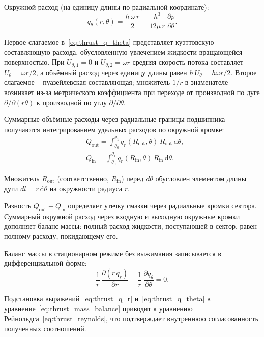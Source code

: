 Окружной расход (на единицу длины по радиальной координате):
\begin{equation}
q_\theta(r,\theta) = \frac{h\,\omega\,r}{2} - \frac{h^3}{12\mu\,r}\,\frac{\partial p}{\partial \theta}.
\label{eq:thrust_q_theta}
\end{equation}

Первое слагаемое в~\eqref{eq:thrust_q_theta} представляет куэттовскую составляющую расхода, обусловленную увлечением жидкости вращающейся поверхностью. При $U_{\theta,1}=0$ и $U_{\theta,2}=\omega r$ средняя скорость потока составляет $\bar{U}_\theta = \omega r / 2$, а объёмный расход через единицу длины равен $h\,\bar{U}_\theta = h\omega r/2$. Второе слагаемое -- пуазейлевская составляющая; множитель $1/r$ в знаменателе возникает из-за метрического коэффициента при переходе от производной по дуге $\partial/\partial(r\theta)$ к производной по углу $\partial/\partial\theta$.

Суммарные объёмные расходы через радиальные границы подшипника получаются интегрированием удельных расходов по окружной кромке:
\begin{equation}
\label{eq:thrust_Q_radial}
\begin{split}
&Q_{\mathrm{out}} = \int_{\theta_0}^{\theta_1} q_r(R_{\mathrm{out}}, \theta)\,R_{\mathrm{out}}\,\mathrm{d}\theta, \\
&Q_{\mathrm{in}} = \int_{\theta_0}^{\theta_1} q_r(R_{\mathrm{in}}, \theta)\,R_{\mathrm{in}}\,\mathrm{d}\theta.
\end{split}
\end{equation}

Множитель $R_{\mathrm{out}}$ (соответственно, $R_{\mathrm{in}}$) перед $d\theta$ обусловлен элементом длины дуги $dl = r\,\mathrm{d}\theta$ на окружности радиуса $r$.

Разность $Q_{\mathrm{out}} - Q_{\mathrm{in}}$ определяет утечку смазки через радиальные кромки сектора. Суммарный окружной расход через входную и выходную окружные кромки дополняет баланс массы: полный расход жидкости, поступающей в сектор, равен полному расходу, покидающему его.

Баланс массы в стационарном режиме без выжимания записывается в дифференциальной форме:
\begin{equation}
\frac{1}{r}\,\frac{\partial (r\,q_r)}{\partial r} + \frac{1}{r}\,\frac{\partial q_\theta}{\partial \theta} = 0.
\label{eq:thrust_mass_balance}
\end{equation}

Подстановка выражений~\eqref{eq:thrust_q_r} и~\eqref{eq:thrust_q_theta} в уравнение~\eqref{eq:thrust_mass_balance} приводит к уравнению Рейнольдса~\eqref{eq:thrust_reynolds}, что подтверждает внутреннюю согласованность полученных соотношений.


